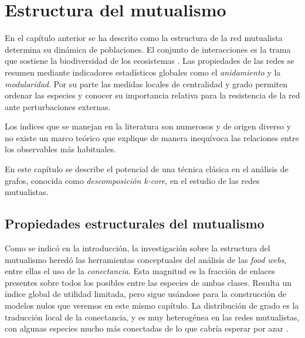 
\chapter{Estructura del mutualismo} %
\label{ChapterESTATICA}  %


En el capítulo anterior se ha descrito como la estructura de la red mutualista determina su dinámica de poblaciones. El conjunto de interacciones es la trama que sostiene la biodiversidad de los ecosistemas \cite{mccann2007protecting}.
Las propiedades de las redes se resumen mediante indicadores estadísticos globales como el \textit{anidamiento}
y la \textit{modularidad}. Por su parte las medidas locales de centralidad y grado permiten ordenar las especies y conocer su importancia relativa para la resistencia de la red ante perturbaciones externas. 

Los índices que se manejan en la literatura son numerosos y de origen diverso y no existe un marco teórico que explique de manera inequívoca las relaciones entre los observables más habituales.

En este capítulo se describe el potencial de una técnica clásica en el análisis de grafos, conocida como \textit{descomposición k-core}, en el estudio de las redes mutualistas.


\section{Propiedades estructurales del mutualismo}
\label{sec:prop_mutualismo}

Como se indicó en la introducción, la investigación sobre la estructura del mutualismo heredó las herramientas conceptuales del análisis de las \textit{food webs}, entre ellas el uso de la \textit{conectancia}. Esta magnitud es la fracción de enlaces presentes sobre todos los posibles entre las especies de ambas clases. Resulta un índice global de utilidad limitada, pero sigue
usándose para la construcción de modelos nulos que veremos en este mismo capítulo. La distribución de grado es la traducción local de la conectancia,
y es muy heterogénea en las redes mutualistas, con algunas especies mucho más conectadas de lo que cabría esperar por azar \cite{jordano2003invariant}.

